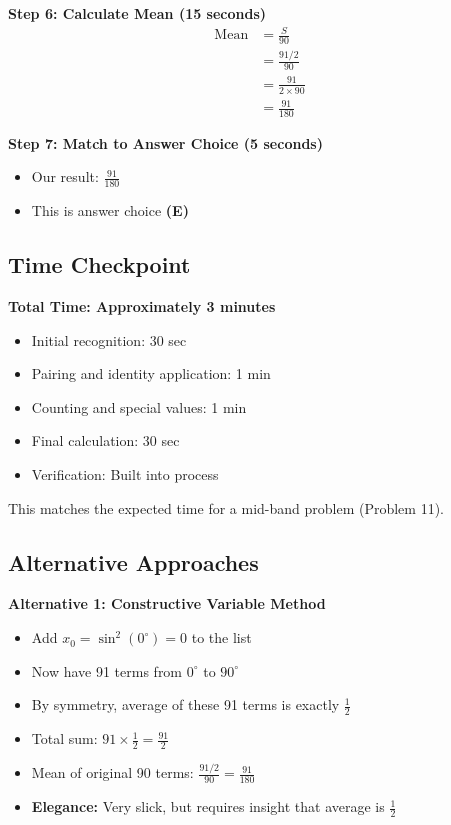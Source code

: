 \documentclass[12pt]{article}
\begin{document}
\begin{solutionbox}
\textbf{Step 6: Calculate Mean (15 seconds)}
\begin{align*}
\text{Mean} &= \frac{S}{90} \\
&= \frac{91/2}{90} \\
&= \frac{91}{2 \times 90} \\
&= \frac{91}{180}
\end{align*}

\textbf{Step 7: Match to Answer Choice (5 seconds)}
\begin{itemize}
    \item Our result: $\frac{91}{180}$
    \item This is answer choice \textbf{(E)}
\end{itemize}

\subsection*{Time Checkpoint}

\textbf{Total Time: Approximately 3 minutes}
\begin{itemize}
    \item Initial recognition: 30 sec
    \item Pairing and identity application: 1 min
    \item Counting and special values: 1 min
    \item Final calculation: 30 sec
    \item Verification: Built into process
\end{itemize}

This matches the expected time for a mid-band problem (Problem 11).

\subsection*{Alternative Approaches}

\textbf{Alternative 1: Constructive Variable Method}
\begin{itemize}
    \item Add $x_0 = \sin^2(0^{\circ}) = 0$ to the list
    \item Now have 91 terms from $0^{\circ}$ to $90^{\circ}$
    \item By symmetry, average of these 91 terms is exactly $\frac{1}{2}$
    \item Total sum: $91 \times \frac{1}{2} = \frac{91}{2}$
    \item Mean of original 90 terms: $\frac{91/2}{90} = \frac{91}{180}$
    \item \textbf{Elegance:} Very slick, but requires insight that average is $\frac{1}{2}$
\end{itemize}


\end{solutionbox}
\end{document}
